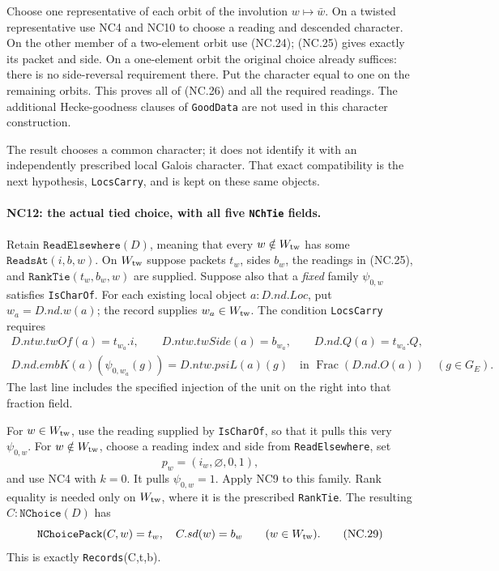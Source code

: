 Choose one representative of each orbit of the involution
\(w\mapsto\bar w\). On a twisted representative use NC4
and NC10 to choose a reading and descended character.
On the other member of a two-element orbit use (NC.24);
(NC.25) gives exactly its packet and side.
On a one-element orbit the original choice already suffices:
there is no side-reversal requirement there.
Put the character equal to one on the remaining orbits.
This proves all of (NC.26) and all the required readings.
The additional Hecke-goodness clauses of \texttt{GoodData}
are not used in this character construction.

The result chooses a common character; it does not identify it
with an independently prescribed local Galois character.
That exact compatibility is the next hypothesis,
\texttt{LocsCarry}, and is kept on these same objects.

\paragraph{NC12: the actual tied choice, with all five \texttt{NChTie} fields.}
Retain \(\texttt{ReadElsewhere}(D)\), meaning that every
\(w\notin W_{\rm tw}\) has some \(\texttt{ReadsAt}(i,b,w)\).
On \(W_{\rm tw}\) suppose packets \(t_w\), sides \(b_w\),
the readings in (NC.25), and \(\texttt{RankTie}(t_w,b_w,w)\)
are supplied. Suppose also that a \emph{fixed} family
\(\psi_{0,w}\) satisfies \texttt{IsCharOf}. For each existing
local object \(a:D.nd.Loc\), put \(w_a=D.nd.w(a)\);
the record supplies \(w_a\in W_{\rm tw}\).
The condition \texttt{LocsCarry} requires
\[
 \begin{gathered}
 D.ntw.twOf(a)=t_{w_a}.i,\qquad
 D.ntw.twSide(a)=b_{w_a},\qquad
 D.nd.Q(a)=t_{w_a}.Q,\\
 D.nd.embK(a)(\psi_{0,w_a}(g))
   =D.ntw.psiL(a)(g)
       \quad\text{in }\operatorname{Frac}(D.nd.O(a))
       \quad(g\in G_E).
 \end{gathered}
 \tag{NC.27}
\]
The last line includes the specified injection of the unit
on the right into that fraction field.

For \(w\in W_{\rm tw}\), use the reading supplied by
\texttt{IsCharOf}, so that it pulls this very \(\psi_{0,w}\).
For \(w\notin W_{\rm tw}\), choose a reading index and side
from \texttt{ReadElsewhere}, set
\[
 p_w=(i_w,\varnothing,0,1),
 \tag{NC.28}
\]
and use NC4 with \(k=0\). It pulls \(\psi_{0,w}=1\).
Apply NC9 to this family. Rank equality is needed only
on \(W_{\rm tw}\), where it is the prescribed \texttt{RankTie}.
The resulting \(C:\texttt{NChoice}(D)\) has
\[
 \texttt{NChoicePack}(C,w)=t_w,\quad C.sd(w)=b_w
 \qquad(w\in W_{\rm tw}).
 \tag{NC.29}
\]
This is exactly \texttt{Records}(C,t,b).

